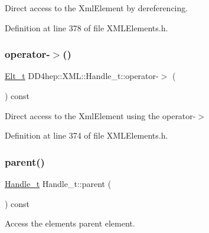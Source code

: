 Direct access to the Xml\+Element by dereferencing. 



Definition at line 378 of file X\+M\+L\+Elements.\+h.

\hypertarget{class_d_d4hep_1_1_x_m_l_1_1_handle__t_af3c62f63d2814f17755b95e25b2ec5c8}{}\label{class_d_d4hep_1_1_x_m_l_1_1_handle__t_af3c62f63d2814f17755b95e25b2ec5c8} 
\subsubsection{\texorpdfstring{operator-\/$>$()}{operator->()}}
{\footnotesize\ttfamily \hyperlink{class_d_d4hep_1_1_x_m_l_1_1_handle__t_a81a72155f29971b37652430a334a6b30}{Elt\+\_\+t} D\+D4hep\+::\+X\+M\+L\+::\+Handle\+\_\+t\+::operator-\/$>$ (\begin{DoxyParamCaption}{ }\end{DoxyParamCaption}) const\hspace{0.3cm}{\ttfamily [inline]}}



Direct access to the Xml\+Element using the operator-\/$>$ 



Definition at line 374 of file X\+M\+L\+Elements.\+h.

\hypertarget{class_d_d4hep_1_1_x_m_l_1_1_handle__t_a989519c7f6229f809980cf9da81d8ed2}{}\label{class_d_d4hep_1_1_x_m_l_1_1_handle__t_a989519c7f6229f809980cf9da81d8ed2} 
\subsubsection{\texorpdfstring{parent()}{parent()}}
{\footnotesize\ttfamily \hyperlink{class_d_d4hep_1_1_x_m_l_1_1_handle__t}{Handle\+\_\+t} Handle\+\_\+t\+::parent (\begin{DoxyParamCaption}{ }\end{DoxyParamCaption}) const}



Access the element\textquotesingle{}s parent element. 



